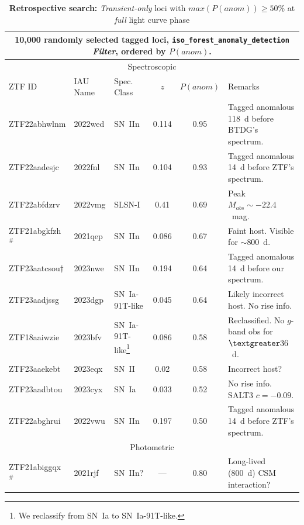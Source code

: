 \documentclass[twocolumn]{aastex63}
\begin{document}
\begin{table}[ht]
\footnotesize
\centering
\caption{\textbf{Retrospective search:} \emph{Transient-only} loci with $max(P(anom))\geq50\%$ at \emph{full} light curve phase}
\begin{tabular}{lllccl}
\multicolumn{6}{c}{10,000 randomly selected tagged loci, \texttt{iso\_forest\_anomaly\_detection} \textit{Filter}, ordered by $P(anom)$.} \\
\hline
\hline
\multicolumn{6}{c}{Spectroscopic} \\
\hline
\hline
ZTF ID & IAU Name & Spec. Class & $z$ & $P(anom)$ & Remarks \\
\hline
\cellcolor{LightCyan}  ZTF22abhwlnm & 2022wed & SN~IIn & 0.114 & 0.95 & Tagged anomalous 118~d before BTDG's spectrum. \\
\cellcolor{LightCyan}  ZTF22aadesjc & 2022fnl & SN~IIn & 0.104 & 0.93 & Tagged anomalous 14~d before ZTF's spectrum. \\
\cellcolor{LightCyan}  ZTF22abfdzrv & 2022vmg & SLSN-I & 0.41 & 0.69 & Peak $M_{abs}\sim-22.4$~mag. \\ %
\cellcolor{LightCyan}  ZTF21abgkfzh$^{\#}$ & 2021qep & SN~IIn & 0.086 & 0.67 & Faint host. Visible for $\sim$800~d. \\
\cellcolor{LightCyan} ZTF23aatcsou$\dagger$ & 2023nwe & SN~IIn & 0.194 & 0.64 & Tagged anomalous 14~d before our spectrum. \\
ZTF23aadjssg & 2023dgp & SN~Ia-91T-like & 0.045 & 0.64 & Likely incorrect host. No rise info. \\
ZTF18aaiwzie & 2023bfv & SN~Ia-91T-like\footnote{We reclassify from SN~Ia to SN~Ia-91T-like.} & 0.086 & 0.58 & Reclassified. No $g$-band obs for $\textgreater36$~d.  \\ %
ZTF23aaekebt & 2023eqx & SN~II & 0.02 & 0.58 & Incorrect host? \\
ZTF23aadbtou & 2023cyx & SN~Ia & 0.033 & 0.52 & No rise info. SALT3 $c=-0.09$. \\
\cellcolor{LightCyan}  ZTF22abghrui & 2022vwu & SN~IIn & 0.197 & 0.50 & Tagged anomalous 14~d before ZTF's spectrum. \\
\hline
\hline
\multicolumn{6}{c}{Photometric} \\
\hline
\hline
\cellcolor{LightCyan} ZTF21abiggqx$^{\#}$ & 2021rjf & SN~IIn? & --- & 0.80 & Long-lived (800~d) CSM interaction? \\ %

\end{tabular}
\end{table}
\end{document}
